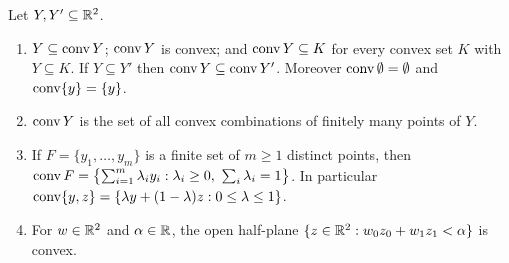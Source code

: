 \begin{lemma}\label{fd:lem:hull}
Let $Y,Y'\subseteq\mathbb R^2$.
\begin{enumerate}[label=(\alph*)]
\item $Y\subseteq\operatorname{conv} Y$; $\operatorname{conv} Y$ is convex; and $\operatorname{conv} Y\subseteq K$ for every convex set $K$ with
  $Y\subseteq K$. If $Y\subseteq Y'$ then $\operatorname{conv} Y\subseteq\operatorname{conv} Y'$. Moreover $\operatorname{conv}\emptyset=\emptyset$
  and $\operatorname{conv}\{y\}=\{y\}$.
\item $\operatorname{conv} Y$ is the set of all convex combinations of finitely many points of $Y$.
\item If $F=\{y_1,\dots,y_m\}$ is a finite set of $m\ge1$ distinct points, then
  $\conv F=\bigl\{\sum_{i=1}^m\lambda_iy_i:\lambda_i\ge0,\ \sum_i\lambda_i=1\bigr\}$. In particular
  $\operatorname{conv}\{y,z\}=\{\lambda y+(1-\lambda)z:0\le\lambda\le1\}$.
\item For $w\in\mathbb R^2$ and $\alpha\in\mathbb R$, the open half-plane $\{z\in\mathbb R^2:w_0z_0+w_1z_1<\alpha\}$ is
  convex.
\end{enumerate}
\end{lemma}

